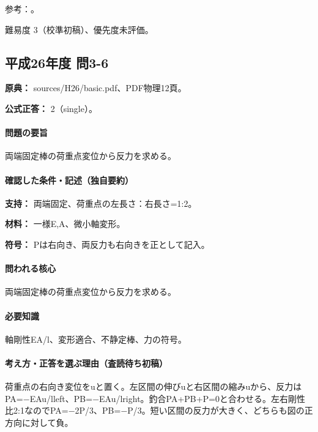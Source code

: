 \par 参考：\cite{mit_material_elastic2000}。

\par 難易度 3（校準初稿）、優先度未評価。

\subsection{平成26年度 問3-6}
\label{q:h26-reg-basic-3-6}

\noindent\textbf{原典：} sources/H26/basic.pdf、PDF物理12頁。

\textbf{公式正答：} 2（single）。

\paragraph{問題の要旨} 両端固定棒の荷重点変位から反力を求める。

\paragraph{確認した条件・記述（独自要約）}\mbox{}\par

\noindent\textbf{支持：} 両端固定、荷重点の左長さ：右長さ=1:2。\par

\noindent\textbf{材料：} 一様E,A、微小軸変形。\par

\noindent\textbf{符号：} Pは右向き、両反力も右向きを正として記入。\par

\paragraph{問われる核心} 両端固定棒の荷重点変位から反力を求める。

\paragraph{必要知識} 軸剛性EA/l、変形適合、不静定棒、力の符号。

\paragraph{考え方・正答を選ぶ理由（査読待ち初稿）} 荷重点の右向き変位をuと置く。左区間の伸びuと右区間の縮みuから、反力はPA=−EAu/lleft、PB=−EAu/lright。釣合PA+PB+P=\allowbreak{}0と合わせる。左右剛性比2:1なのでPA=−2P/3、PB=−P/3。短い区間の反力が大きく、どちらも図の正方向に対して負。


